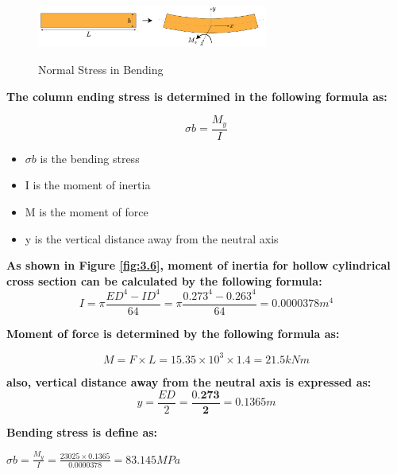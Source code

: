 { \begin{figure}[htp]
    \centering
    \includegraphics[width=3in]{Figures/bending_moment.jpg}
    \caption{Normal Stress in Bending}
    \cite{boston_2022}
    \label{fig:3.7}
\end{figure}
 
 \textbf{The column ending stress is determined in the following formula as:}
 
 \begin{equation}
\sigma b = \frac{M_y}{I}
\end{equation}

\begin{itemize}[label={}]
    \item \(\sigma b\) is the bending stress
    \item I is the moment of inertia 
    \item  M is the moment of force
    \item y is the vertical distance away from the neutral axis
\end{itemize}


\textbf{ As shown in Figure \ref{fig:3.6}, moment of inertia for hollow cylindrical cross section can be 
calculated by the following formula:}
\begin{equation}
    I= {\pi}\frac{{{ED}}^{{4}}-{{ID}}^{4}}{{64}} ={\pi}\frac{{0}.{273}^4-{0}.{263}^4}{{64}} = 0.0000378{m}^{4}
\end{equation}

\textbf{Moment of force is determined by the following formula as:}

\begin{equation}
M = {{F}\times{L}}
 = {15.35}\times{{10}}^{3}\times{1.4}= 21.5kNm 
\end{equation}



\textbf{also, vertical distance away from the neutral axis is expressed as:}
\begin{equation}
y = \frac{ED}{2}  =\frac{{0}.\mathbf{273}}{\mathbf{2}}= 0.1365m
\end{equation}

\textbf{Bending stress is define as:}

\(\sigma b = \frac{{M_y}}{{I}} = \frac{{23025}\times{0}.{1365}}{{0.0000378}} = 83.145MPa\) 





}

